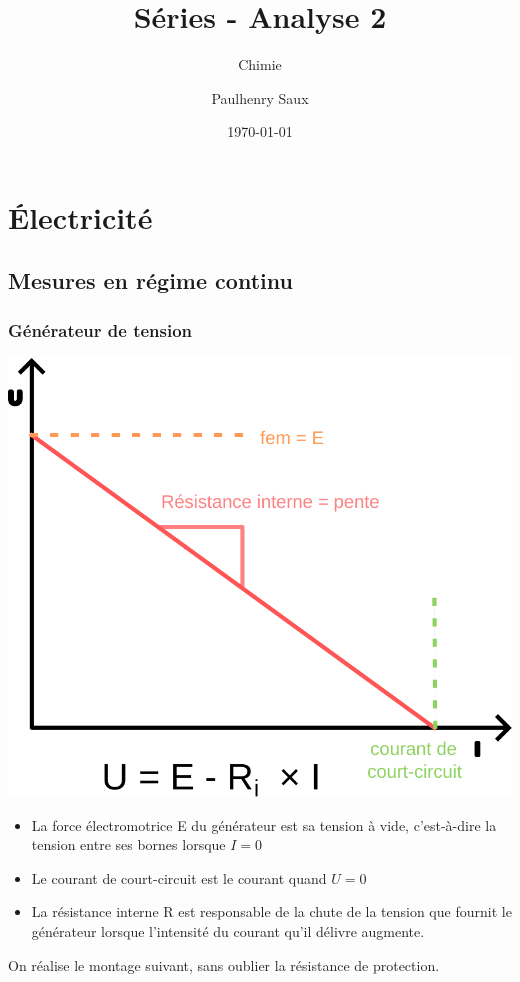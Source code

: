 \documentclass[french]{yLectureNote}
\title{Séries - Analyse 2}
\subtitle{Chimie}
\author{Paulhenry Saux}
\date{\today}
\begin{document}
\setcounter{chapter}{0}
\chapter{Électricité }
\section{Mesures en régime continu}
\subsection{Générateur de tension}
\includegraphics[scale=0.5]{tension}
\begin{definition}
\begin{itemize}
 \item La force électromotrice E du générateur est sa tension à vide, c'est-à-dire la tension entre ses bornes lorsque $I=0$
\item Le courant de court-circuit est le courant quand $U=0$
\item La résistance interne R  est responsable de la chute de la tension que fournit le générateur lorsque l'intensité du courant qu'il délivre augmente.
\end{itemize}

\end{definition}
On réalise le montage suivant, sans oublier la résistance de protection.
\end{document}
